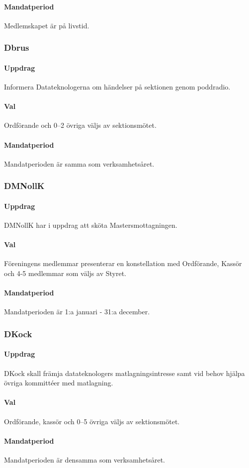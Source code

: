 \paragraph{Mandatperiod}
Medlemskapet är på livstid.
\subsubsection{Dbrus}
\paragraph{Uppdrag}
Informera Datateknologerna om händelser på sektionen genom poddradio.
\paragraph{Val}
Ordförande och 0–2 övriga väljs av sektionsmötet.
\paragraph{Mandatperiod}
Mandatperioden är samma som verksamhetsåret.
\subsubsection{DMNollK}
\paragraph{Uppdrag}
DMNollK har i uppdrag att sköta Mastersmottagningen.
\paragraph{Val}
Föreningens medlemmar presenterar en konstellation med Ordförande, Kassör och 4-5 medlemmar som väljs av Styret.
\paragraph{Mandatperiod}
Mandatperioden är 1:a januari - 31:a december.
\subsubsection{DKock}
\paragraph{Uppdrag}
DKock skall främja datateknologers matlagningsintresse samt vid behov hjälpa övriga kommittéer med matlagning.
\paragraph{Val}
Ordförande, kassör och 0–5 övriga väljs av sektionsmötet.
\paragraph{Mandatperiod}
Mandatperioden är densamma som verksamhetsåret.
\newpage
